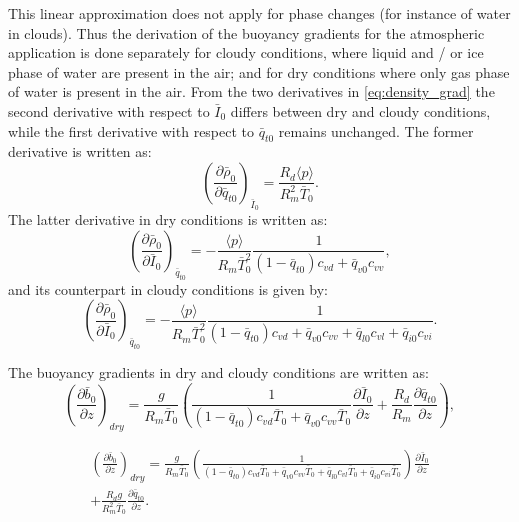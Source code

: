 \documentclass{report}
\begin{document}
This linear approximation does not apply for phase changes (for instance of water in clouds). Thus the derivation of the buoyancy gradients for the atmospheric application is done separately for cloudy conditions, where liquid and / or ice phase of water are present in the air; and for dry conditions where only gas phase of water is present in the air. From the two derivatives in \eqref{eq:density_grad} the second derivative with respect to $\bar{I}_0$ differs between dry and cloudy conditions, while the first derivative with respect to $\bar{q}_{t0}$ remains unchanged. The former derivative is written as:
\begin{equation}
\label{eq:density_grad_qt} 
\left( \frac{\partial \bar{\rho}_0}{\partial \bar{q}_{t0}} \right)_{\bar{I}_0} = \frac{R_d \langle p \rangle}{R_m^2 \bar{T}_0}.
\end{equation}
The latter derivative in dry conditions is written as:
\begin{equation}
\label{eq:density_grad_I_dry} 
\left( \frac{\partial \bar{\rho}_0}{\partial \bar{I}_0}\right)_{\bar{q}_{t0}} = - \frac{\langle p \rangle}{R_m \bar{T}^2_0} \frac{1}{(1-\bar{q}_{t0})c_{vd} + \bar{q}_{v0}c_{vv}},
\end{equation}
and its counterpart in cloudy conditions is given by:
\begin{equation}
\label{eq:density_grad_I_cloudy} 
\left( \frac{\partial \bar{\rho}_0}{\partial \bar{I}_0}\right)_{\bar{q}_{t0}} = - \frac{\langle p \rangle}{R_m \bar{T}^2_0} \frac{1}{(1-\bar{q}_{t0})c_{vd} + \bar{q}_{v0}c_{vv} + \bar{q}_{l0}c_{vl} + \bar{q}_{i0}c_{vi}}.
\end{equation}

The buoyancy gradients in dry and cloudy conditions are written as:
\begin{equation}
\label{eq:buoyancy_gradient_dry} 
\left( \frac{\partial \bar{b}_0}{\partial z}\right)_{dry} = \frac{g}{R_m \bar{T}_0} \left(\frac{1}{(1-\bar{q}_{t0})c_{vd}\bar{T}_0 + \bar{q}_{v0}c_{vv}\bar{T}_0}\frac{\partial \bar{I}_0}{\partial z} +  \frac{R_d}{R_m} \frac{\partial \bar{q}_{t0}}{\partial z} \right),
\end{equation}

\begin{multline}
\label{eq:buoyancy_gradient_cloudy} 
\left( \frac{\partial \bar{b}_0}{\partial z}\right)_{dry} = \frac{g}{R_m \bar{T}_0} \left(\frac{1}{(1-\bar{q}_{t0})c_{vd}\bar{T}_0 + \bar{q}_{v0}c_{vv}\bar{T}_0 + \bar{q}_{l0}c_{vl}\bar{T}_0 + \bar{q}_{i0}c_{vi}\bar{T}_0}\right)\frac{\partial \bar{I}_0}{\partial z} \\ 
+ \frac{R_d g}{R_m^2 \bar{T}_0} \frac{\partial \bar{q}_{t0}}{\partial z}.
\end{multline}


\end{document}
